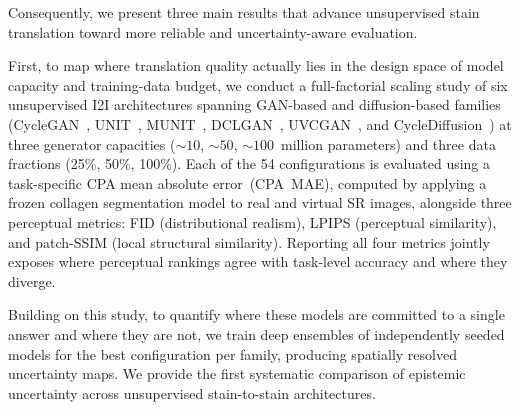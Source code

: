 Consequently, we present three main results that advance unsupervised stain
translation toward more reliable and uncertainty-aware evaluation.

First, to map where translation quality actually lies in the design space of model
capacity and training-data budget, we conduct a full-factorial scaling study of six
unsupervised I2I architectures spanning GAN-based and diffusion-based families
(CycleGAN~\cite{zhu2017unpaired}, UNIT~\cite{liu2017unsupervised},
MUNIT~\cite{huang2018multimodal}, DCLGAN~\cite{han2021dual},
UVCGAN~\cite{torbunov2022uvcgan}, and CycleDiffusion~\cite{wu2022cyclediffusion}) at
three generator capacities (${\sim}10$, ${\sim}50$, ${\sim}100$~million parameters) and
three data fractions (25\%, 50\%, 100\%). Each of the 54 configurations is evaluated
using a task-specific CPA mean absolute error~(CPA~MAE), computed by applying a frozen
collagen segmentation model to real and virtual SR images, alongside three perceptual metrics: FID (distributional
realism), LPIPS (perceptual similarity), and patch-SSIM (local structural similarity).
Reporting all four metrics jointly exposes where perceptual rankings agree with
task-level accuracy and where they diverge.

Building on this study, to quantify where these models are committed to a single
answer and where they are not, we train deep ensembles of independently seeded
models for the best configuration per family, producing spatially resolved uncertainty
maps. We provide the first systematic comparison of epistemic uncertainty across unsupervised
stain-to-stain architectures.

